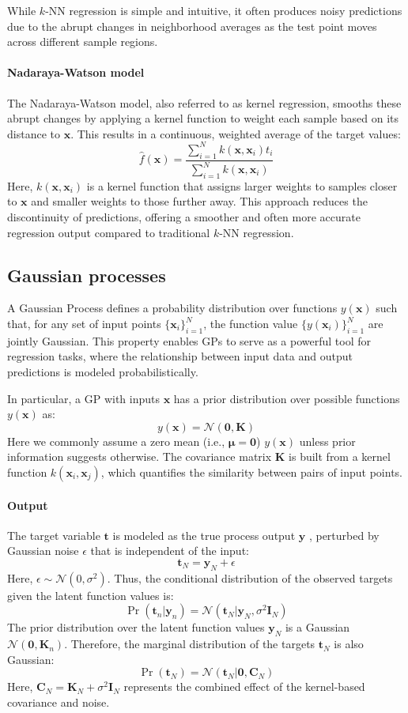 While $k$-NN regression is simple and intuitive, it often produces noisy predictions due to the abrupt changes in neighborhood averages as the test point moves across different sample regions.

\paragraph*{Nadaraya-Watson model}
The Nadaraya-Watson model, also referred to as kernel regression, smooths these abrupt changes by applying a kernel function to weight each sample based on its distance to $\mathbf{x}$. 
This results in a continuous, weighted average of the target values:
\[\hat{f}(\mathbf{x})=\dfrac{\sum_{i=1}^N k(\mathbf{x},\mathbf{x}_i)t_i}{\sum_{i=1}^N k(\mathbf{x},\mathbf{x}_i)}\]
Here, $k(\mathbf{x},\mathbf{x}_i)$ is a kernel function that assigns larger weights to samples closer to $\mathbf{x}$ and smaller weights to those further away.
This approach reduces the discontinuity of predictions, offering a smoother and often more accurate regression output compared to traditional $k$-NN regression.

\subsection{Gaussian processes}
A Gaussian Process defines a probability distribution over functions $y(\mathbf{x})$  such that, for any set of input points $\{\mathbf{x}_i\}_{i=1}^{N}$, the function value $\{y(\mathbf{x}_i)\}_{i=1}^{N}$ are jointly Gaussian.
This property enables GPs to serve as a powerful tool for regression tasks, where the relationship between input data and output predictions is modeled probabilistically.
 
In particular, a GP with inputs $\mathbf{x}$ has a prior distribution over possible functions $y(\mathbf{x})$ as:
\[y(\mathbf{x})=\mathcal{N}(\mathbf{0},\mathbf{K})\]
Here we commonly assume a zero mean (i.e., $\boldsymbol{\mu}=\mathbf{0}$) $y(\mathbf{x})$ unless prior information suggests otherwise.
The covariance matrix $\mathbf{K}$ is built from a kernel function $k(\mathbf{x}_i,\mathbf{x}_j)$, which quantifies the similarity between pairs of input points.  

\paragraph*{Output}
The target variable $\mathbf{t}$ is modeled as the true process output $\mathbf{y}$ , perturbed by Gaussian noise $\epsilon$ that is independent of the input:
\[\mathbf{t}_N=\mathbf{y}_N+\epsilon\]
Here, $\epsilon\sim\mathcal{N}(0,\sigma^2)$. 
Thus, the conditional distribution of the observed targets given the latent function values is:
\[\Pr(\mathbf{t}_n|\mathbf{y}_n)=\mathcal{N}(\mathbf{t}_N|\mathbf{y}_N,\sigma^2\mathbf{I}_N)\]
The prior distribution over the latent function values $\mathbf{y}_N$ is a Gaussian $\mathcal{N}(\mathbf{0},\mathbf{K}_n)$. 
Therefore, the marginal distribution of the targets $\mathbf{t}_N$ is also Gaussian:
\[\Pr(\mathbf{t}_N)=\mathcal{N}(\mathbf{t}_N|\mathbf{0},\mathbf{C}_N)\]
Here, $\mathbf{C}_N=\mathbf{K}_N+\sigma^2\mathbf{I}_N$ represents the combined effect of the kernel-based covariance and noise.

